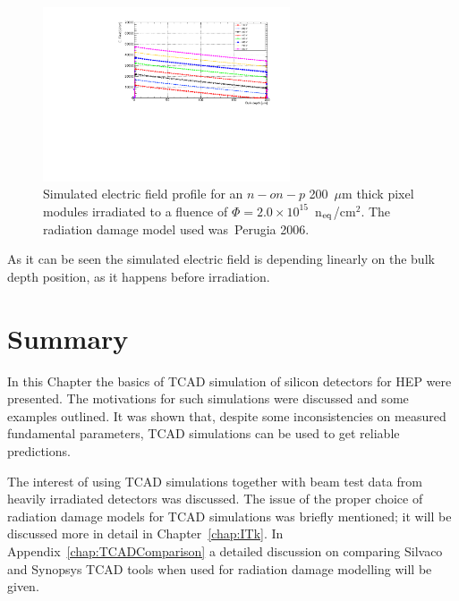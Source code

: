 \begin{figure}[!htpb]
\centering
\includegraphics[width=0.65\textwidth]{EField_Natascha_fl2e15_Petasecca.pdf}
\caption{\label{fig:EField_Profile_Perugia2006}Simulated electric field profile for an $n-on-p$ 200~$\mu$m thick pixel modules irradiated to a fluence of 
$\Phi = 2.0\times10^{15}$~n$_{\rm eq}$/cm$^2$. The radiation damage model used was~Perugia 2006\cite{Moscatelli-2006}.}
\end{figure}
As it can be seen the simulated electric field is depending linearly on the bulk depth position, 
as it happens before irradiation. 



\section{Summary}
\label{sec:TCADSummary}

In this Chapter the basics of TCAD simulation of silicon detectors for HEP were presented. 
The motivations for such simulations were discussed and some examples outlined. 
It was shown that, despite some inconsistencies on measured fundamental parameters, TCAD 
simulations can be used to get reliable predictions. 

The interest of using TCAD simulations together with beam test data from heavily irradiated detectors 
was discussed. The issue of the proper choice of radiation damage models for TCAD simulations 
was briefly mentioned; it will be discussed more in detail in Chapter~\ref{chap:ITk}. 
In Appendix~\ref{chap:TCADComparison} a detailed discussion on comparing Silvaco and Synopsys 
TCAD tools when used for radiation damage modelling will be given.


